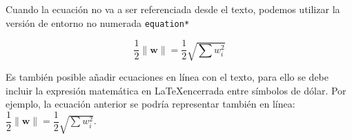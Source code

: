 Cuando la ecuación no va a ser referenciada desde el texto, podemos utilizar la versión de entorno no numerada \verb|equation*|

\begin{equation*}
\label{Eq:ejemplo_ecuacion2}
\dfrac{1}{2}\parallel\mathbf{w}\parallel=\dfrac{1}{2}\sqrt{\sum w_{i}^{2}}
\end{equation*}

Es también posible añadir ecuaciones en línea con el texto, para ello se debe incluir la expresión matemática en \LaTeX encerrada entre símbolos de dólar. Por ejemplo, la ecuación anterior se podría representar también en línea: $\dfrac{1}{2}\parallel\mathbf{w}\parallel=\dfrac{1}{2}\sqrt{\sum w_{i}^{2}}$.